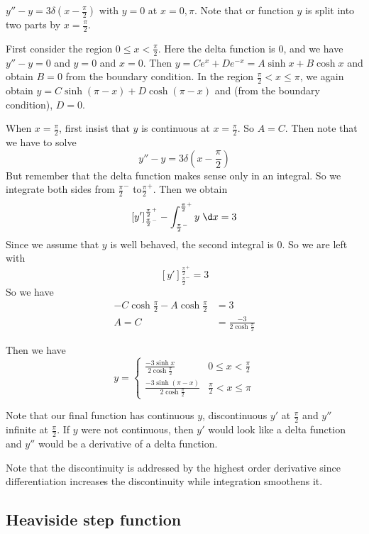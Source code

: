 \documentclass[a4paper]{article}
\begin{document}
  \begin{eg}
    $y'' - y = 3\delta(x - \frac{\pi}{2})$ with $y = 0$ at $x = 0, \pi$. Note that or function $y$ is split into two parts by $x = \frac{\pi}{2}$.

    First consider the region $0 \leq x < \frac{\pi}{2}$. Here the delta function is $0$, and we have $y'' - y = 0$ and $y = 0$ and $x = 0$. Then $y = Ce^x + De^{-x} = A\sinh x + B\cosh x$ and obtain $B = 0$ from the boundary condition. 
    In the region $\frac{\pi}{2} < x \leq \pi$, we again obtain $y = C\sinh(\pi - x) + D\cosh (\pi - x)$ and (from the boundary condition), $D = 0$.

    When $x = \frac{\pi}{2}$, first insist that $y$ is continuous at $x = \frac{\pi}{2}$. So $A = C$. Then note that we have to solve 
    \[
      y'' - y = 3\delta\left(x - \frac{\pi}{2}\right)
    \]
    But remember that the delta function makes sense only in an integral. So we integrate both sides from $\frac{\pi}{2}^-$ to$\frac{\pi}{2}^+$. Then we obtain
    \[
      [y']^{\frac{\pi}{2}^+}_{\frac{\pi}{2}^-} - \int_{\frac{\pi}{2}^-}^{\frac{\pi}{2}^+} y\;\d x= 3
    \]
    Since we assume that $y$ is well behaved, the second integral is 0. So we are left with 
    \[
      [y']^{\frac{\pi}{2}^+}_{\frac{\pi}{2}^-} = 3
    \]
    So we have 
    \begin{align*}
      -C\cosh \frac{\pi}{2} - A\cosh\frac{\pi}{2} &= 3\\
      A = C &= \frac{-3}{2\cosh \frac{\pi}{2}}
    \end{align*}
  \end{eg}
  Then we have 
  \[
    y =
    \begin{cases}
      \frac{-3\sinh x}{2\cosh \frac{\pi}{2}} & 0 \leq x < \frac{\pi}{2}\\
      \frac{-3\sinh(\pi - x)}{2\cosh \frac{\pi}{2}} & \frac{\pi}{2} < x \leq \pi
    \end{cases}
  \]

  Note that our final function has continuous $y$, discontinuous $y'$ at $\frac{\pi}{2}$ and $y''$ infinite at $\frac{\pi}{2}$. If $y$ were not continuous, then $y'$ would look like a delta function and $y''$ would be a derivative of a delta function.

  Note that the discontinuity is addressed by the highest order derivative since differentiation increases the discontinuity while integration smoothens it.

  \subsection{Heaviside step function}
\end{document}
